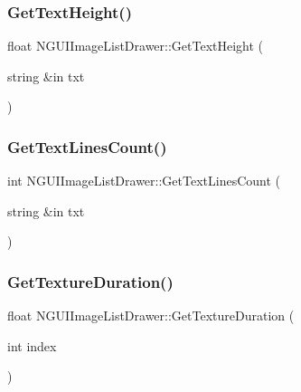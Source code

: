 \subsubsection{\texorpdfstring{Get\+Text\+Height()}{GetTextHeight()}}
{\footnotesize\ttfamily float N\+G\+U\+I\+Image\+List\+Drawer\+::\+Get\+Text\+Height (\begin{DoxyParamCaption}\item[{string \&in}]{txt }\end{DoxyParamCaption})}

\hypertarget{class_n_g_u_i_image_list_drawer_ad822b089a08209066c28a8782d16efaa}{}\label{class_n_g_u_i_image_list_drawer_ad822b089a08209066c28a8782d16efaa} 
\subsubsection{\texorpdfstring{Get\+Text\+Lines\+Count()}{GetTextLinesCount()}}
{\footnotesize\ttfamily int N\+G\+U\+I\+Image\+List\+Drawer\+::\+Get\+Text\+Lines\+Count (\begin{DoxyParamCaption}\item[{string \&in}]{txt }\end{DoxyParamCaption})}

\hypertarget{class_n_g_u_i_image_list_drawer_a92be732dc21462614504e15e5410d4c6}{}\label{class_n_g_u_i_image_list_drawer_a92be732dc21462614504e15e5410d4c6} 
\subsubsection{\texorpdfstring{Get\+Texture\+Duration()}{GetTextureDuration()}}
{\footnotesize\ttfamily float N\+G\+U\+I\+Image\+List\+Drawer\+::\+Get\+Texture\+Duration (\begin{DoxyParamCaption}\item[{int}]{index }\end{DoxyParamCaption})}

\hypertarget{class_n_g_u_i_image_list_drawer_a17eb90953e7961afc889e34790293a3c}{}\label{class_n_g_u_i_image_list_drawer_a17eb90953e7961afc889e34790293a3c} 
